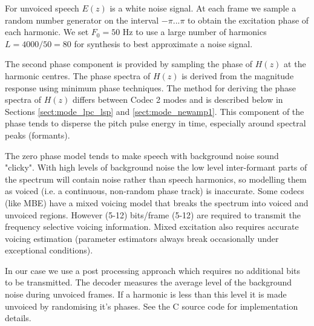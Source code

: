 \documentclass{article}
\begin{document}
{For unvoiced speech $E(z)$ is a white noise signal.  At each frame we sample a random number generator on the interval $-\pi ... \pi$ to obtain the excitation phase of each harmonic.  We set $F_0 = 50$ Hz to use a large number of harmonics $L=4000/50=80$ for synthesis to best approximate a noise signal.

The second phase component is provided by sampling the phase of $H(z)$ at the harmonic centres.  The phase spectra of $H(z)$ is derived from the magnitude response using minimum phase techniques.  The method for deriving the phase spectra of $H(z)$ differs between Codec 2 modes and is described below in Sections \ref{sect:mode_lpc_lsp} and \ref{sect:mode_newamp1}.  This component of the phase tends to disperse the pitch pulse energy in time, especially around spectral peaks (formants).

The zero phase model tends to make speech with background noise sound "clicky".  With high levels of background noise the low level inter-formant parts of the spectrum will contain noise rather than speech harmonics, so modelling them as voiced (i.e. a continuous, non-random phase track) is inaccurate. Some codecs (like MBE) have a mixed voicing model that breaks the spectrum into voiced and unvoiced regions.  However (5-12) bits/frame (5-12) are required to transmit the frequency selective voicing information.  Mixed excitation also requires accurate voicing estimation (parameter estimators always break occasionally under exceptional conditions).

In our case we use a post processing approach which requires no additional bits to be transmitted.  The decoder measures the average level of the background noise during unvoiced frames.  If a harmonic is less than this level it is made unvoiced by randomising it's phases.  See the C source code for implementation details.

}
\end{document}
